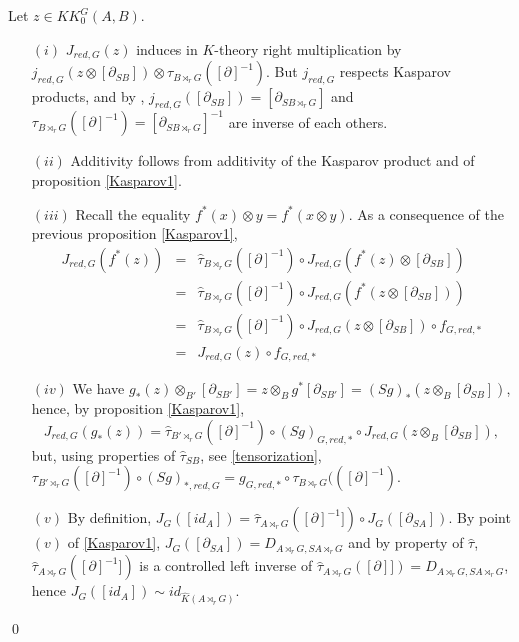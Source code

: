 \begin{dem} Let $z\in KK_0^G(A,B)$.
\begin{itemize}
\item[$(i)$] $J_{red,G}(z)$ induces in $K$-theory right multiplication by $j_{red,G}(z\otimes [\partial_{SB}])\otimes \tau_{B\rtimes_r G}([\partial]^{-1})$. But $j_{red, G}$ respects Kasparov products, and by \cite{LeGall}, $j_{red,G}([\partial_{SB}]) = [\partial_{SB\rtimes_r G}]$ and $\tau_{B\rtimes_r G}([\partial]^{-1}) = [\partial_{SB\rtimes_r G }]^{-1}$ are inverse of each others.
\item[$(ii)$] Additivity follows from additivity of the Kasparov product and of proposition \ref{Kasparov1}.
\item[$(iii)$] Recall the equality $f^*(x)\otimes y = f^*(x\otimes y)$. As a consequence of the previous proposition \ref{Kasparov1},
\[\begin{array}{lcl} J_{red,G}(f^*(z)) & = &  \hat\tau_{B\rtimes_r G}([\partial]^{-1}) \circ J_{red,G}(f^*(z)\otimes [\partial_{SB}]) \\
		& = &  \hat\tau_{B\rtimes_r G}([\partial]^{-1}) \circ J_{red,G}(f^*(z\otimes [\partial_{SB}]))\\
		& = &  \hat\tau_{B\rtimes_r G}([\partial]^{-1}) \circ J_{red,G}(z\otimes [\partial_{SB}])\circ f_{G,red,*}\\
		& = & J_{red,G}(z) \circ f_{G,red,*}
\end{array}\]
\item[$(iv)$] We have $g_*(z)\otimes_{B'} [\partial_{SB'}] = z\otimes_B g^{*}[\partial _{SB'}] = (Sg)_{*}(z\otimes_B [\partial _{SB}])$, hence, by proposition \ref{Kasparov1}, 
\[J_{red,G}(g_*(z)) = \hat\tau_{B'\rtimes_r G}([\partial]^{-1}) \circ (Sg)_{G,red,*} \circ J_{red,G}(z\otimes_B [\partial_{SB}]),\]
but, using properties of $\hat\tau_{SB}$, see \ref{tensorization}, $\tau_{B'\rtimes_r G}([\partial]^{-1})\circ (Sg)_{*,red,G} = g_{G,red,*}\circ\tau_{B\rtimes_r G}(([\partial]^{-1})$.
\item[$(v)$] By definition, $J_G([id_A]) = \hat\tau_{A\rtimes_r G}([\partial]^{-1}]) \circ J_G([\partial_{SA}])$. By point $(v)$ of \ref{Kasparov1}, $J_G([\partial_{SA}]) = D_{A\rtimes_r G,SA\rtimes_r G}$ and by property of $\hat \tau$, $\hat\tau_{A\rtimes_r G}([\partial]^{-1}]) $ is a controlled left inverse of $\hat\tau_{A\rtimes_r G}([\partial]])= D_{A\rtimes_r G,SA\rtimes_r G}$, hence $J_G([id_A])\sim id_{\hat K(A\rtimes_r G)}$. 
\end{itemize}
\qed
\end{dem}

